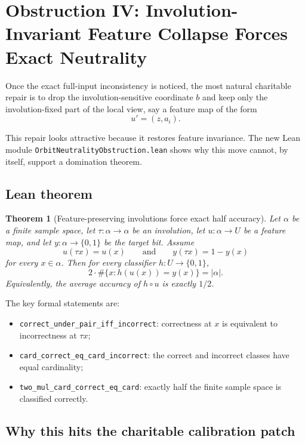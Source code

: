 \documentclass[11pt]{article}
\newtheorem{theorem}{Theorem}[section]
\theoremstyle{remark}
\begin{document}
\section{Obstruction IV: Involution-Invariant Feature Collapse Forces Exact Neutrality}

Once the exact full-input inconsistency is noticed, the most natural charitable repair is to drop
the involution-sensitive coordinate \(b\) and keep only the involution-fixed part of the local view,
say a feature map of the form
\[
  u' = (z, a_i).
\]

This repair looks attractive because it restores feature invariance.  The new Lean module
\texttt{OrbitNeutralityObstruction.lean} shows why this move cannot, by itself, support a
domination theorem.

\subsection{Lean theorem}

\begin{theorem}[Feature-preserving involutions force exact half accuracy]
Let \(\alpha\) be a finite sample space, let \(\tau : \alpha \to \alpha\) be an involution, let
\(u : \alpha \to U\) be a feature map, and let \(y : \alpha \to \{0,1\}\) be the target bit.
Assume
\[
  u(\tau x) = u(x)
  \qquad\text{and}\qquad
  y(\tau x) = 1 - y(x)
\]
for every \(x \in \alpha\).  Then for every classifier \(h : U \to \{0,1\}\),
\[
  2 \cdot \#\{x : h(u(x)) = y(x)\} = |\alpha|.
\]
Equivalently, the average accuracy of \(h \circ u\) is exactly \(1/2\).
\end{theorem}

\noindent
The key formal statements are:
\begin{itemize}[leftmargin=1.5em]
  \item \texttt{correct\_under\_pair\_iff\_incorrect}: correctness at \(x\) is equivalent to
  incorrectness at \(\tau x\);
  \item \texttt{card\_correct\_eq\_card\_incorrect}: the correct and incorrect classes have equal
  cardinality;
  \item \texttt{two\_mul\_card\_correct\_eq\_card}: exactly half the finite sample space is
  classified correctly.
\end{itemize}

\subsection{Why this hits the charitable calibration patch}
\end{document}

